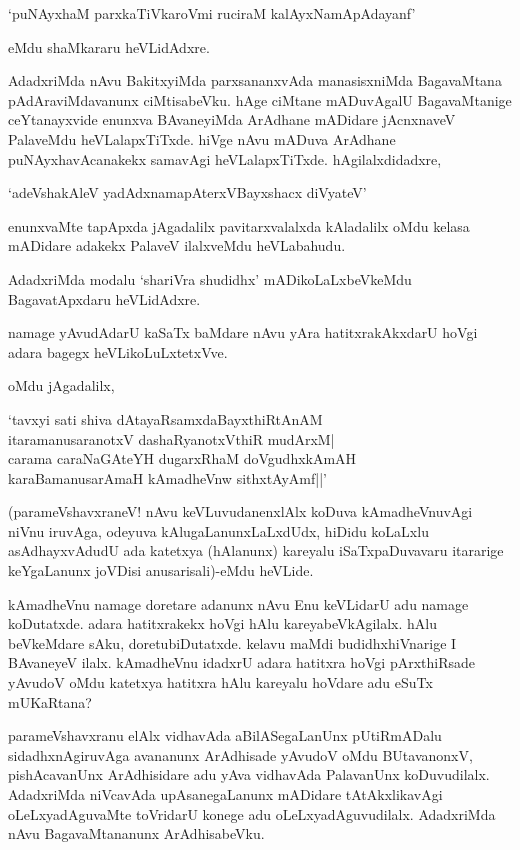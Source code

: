 \begin{shloka}
`puNAyxhaM parxkaTiVkaroVmi ruciraM kalAyxNamApAdayanf'
\end{shloka}

\noindent eMdu shaMkararu heVLidAdxre.

AdadxriMda nAvu BakitxyiMda parxsananxvAda manasisxniMda BagavaMtana pAdAraviMdavanunx ciMtisabeVku. hAge ciMtane mADuvAgalU BagavaMtanige ceYtanayxvide enunxva BAvaneyiMda ArAdhane mADidare jAcnxnaveV PalaveMdu heVLalapxTiTxde. hiVge nAvu mADuva ArAdhane puNAyxhavAcanakekx samavAgi heVLalapxTiTxde. hAgilalxdidadxre,

\begin{shloka}
`adeVshakAleV yadAdxnamapAterxVBayxshacx diVyateV'
\end{shloka}

\noindent enunxvaMte tapApxda jAgadalilx pavitarxvalalxda kAladalilx oMdu kelasa mADidare adakekx PalaveV ilalxveMdu heVLabahudu.

AdadxriMda modalu `shariVra shudidhx' mADikoLaLxbeVkeMdu BagavatApxdaru heVLidAdxre.

namage yAvudAdarU kaSaTx baMdare nAvu yAra hatitxrakAkxdarU hoVgi adara bagegx heVLikoLuLxtetxVve.

oMdu jAgadalilx, 

\begin{shloka}
`tavxyi sati shiva dAtayaRsamxdaBayxthiRtAnAM\\
itaramanusaranotxV dashaRyanotxVthiR mudArxM|\\
carama caraNaGAteYH dugarxRhaM doVgudhxkAmAH\\
karaBamanusarAmaH kAmadheVnw sithxtAyAmf||'
\end{shloka}

(parameVshavxraneV! nAvu keVLuvudanenxlAlx koDuva kAmadheVnuvAgi niVnu iruvAga, odeyuva kAlugaLanunxLaLxdUdx, hiDidu koLaLxlu asAdhayxvAdudU ada katetxya (hAlanunx) kareyalu iSaTxpaDuvavaru itararige keYgaLanunx joVDisi anusarisali)-eMdu heVLide.

kAmadheVnu namage doretare adanunx nAvu Enu keVLidarU adu namage koDutatxde. adara hatitxrakekx hoVgi hAlu kareyabeVkAgilalx. hAlu beVkeMdare sAku, doretubiDutatxde. kelavu maMdi budidhxhiVnarige I BAvaneyeV ilalx. kAmadheVnu idadxrU adara hatitxra hoVgi pArxthiRsade yAvudoV oMdu katetxya hatitxra hAlu kareyalu hoVdare adu eSuTx mUKaRtana? 

parameVshavxranu elAlx vidhavAda aBilASegaLanUnx pUtiRmADalu sidadhxnAgiruvAga avananunx ArAdhisade yAvudoV oMdu BUtavanonxV, pishAcavanUnx ArAdhisidare adu yAva vidhavAda PalavanUnx koDuvudilalx. AdadxriMda niVcavAda upAsanegaLanunx mADidare tAtAkxlikavAgi oLeLxyadAguvaMte toVridarU konege adu oLeLxyadAguvudilalx. AdadxriMda nAvu BagavaMtananunx ArAdhisabeVku.

